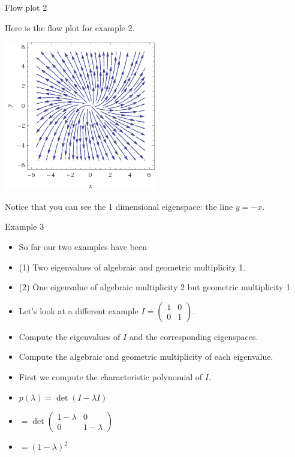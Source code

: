 \documentclass{beamer}
\begin{document}
\begin{frame}{Flow plot 2}


Here is the flow plot for example 2.

\pause

\begin{center}
\includegraphics[scale=0.45]{stream2}
\end{center}

\pause

Notice that you can see the 1 dimensional eigenspace: the line $y=-x$.

\end{frame}

\begin{frame}{Example 3}

\begin{itemize}
\item So far our two examples have been
\item (1) Two eigenvalues of algebraic and geometric multiplicity 1.
\item (2) One eigenvalue of algebraic multiplicity 2 but geometric multiplicity 1
\item Let's look at a different example
$I=
\begin{pmatrix}
1 & 0 \\
0 & 1
\end{pmatrix}
$.
\item Compute the eigenvalues of $I$ and the corresponding eigenspaces.
\item Compute the algebraic and geometric multiplicity of each eigenvalue.
\item First we compute the characteristic polynomial of $I$.
\item $p(\lambda) = \det(I-\lambda I)$
\item $=\det
\begin{pmatrix}
1 -\lambda & 0 \\
0 & 1 - \lambda
\end{pmatrix}
$
\item $=(1-\lambda)^2$
\end{itemize}
\end{frame}
\end{document}
